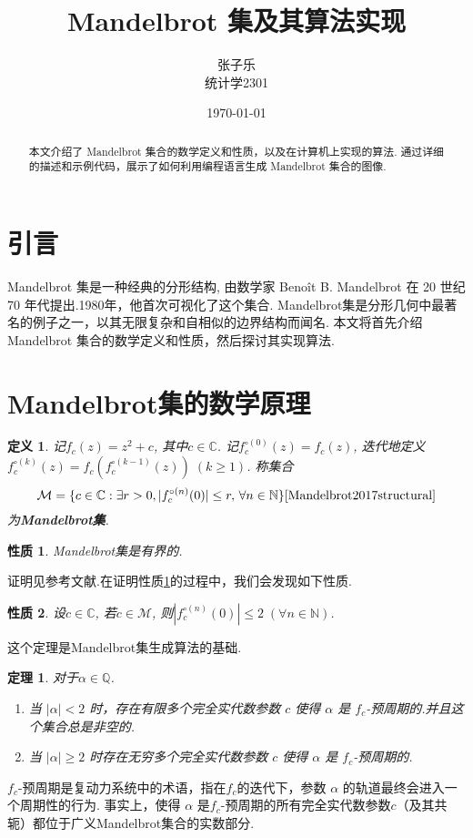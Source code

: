 \documentclass[12pt,a4paper]{ctexart}
\title{Mandelbrot 集及其算法实现}
\author{张子乐 \\ 统计学2301}
\date{\today}
\newtheorem{theorem}{定理}[section]
\newtheorem{definition}{定义}
\newtheorem{property}{性质}
\begin{document}
\maketitle

\begin{abstract}
  本文介绍了 Mandelbrot 集合的数学定义和性质，以及在计算机上实现的算法. 
  通过详细的描述和示例代码，展示了如何利用编程语言生成 Mandelbrot 集合的图像. 
\end{abstract}

\section{引言}
Mandelbrot 集是一种经典的分形结构,  由数学家 Benoît B. Mandelbrot 在 20 世纪 70 年代提出.1980年，他首次可视化了这个集合.
\cite{Mandelbrot2017structural}
Mandelbrot集是分形几何中最著名的例子之一，以其无限复杂和自相似的边界结构而闻名.
本文将首先介绍 Mandelbrot 集合的数学定义和性质，然后探讨其实现算法. 

\section{Mandelbrot集的数学原理}

\begin{definition}
    记$f_c(z)=z^2+c$, 其中$c\in\mathbb{C}$. 记$f_c^{\circ(0)}(z)=f_c(z)$, 
    迭代地定义$f^{\circ(k)}_c(z)=f_c(f^{\circ(k-1)}_c(z))\;(k\geq 1)$. 称集合
    \begin{equation*}
        \mathcal{M}=\{c \in \mathbb{C} : \exists r > 0, | f_c^{\circ(n)}(0) | \leq r, \, \forall n \in \mathbb{N}\}
        \cite{Mandelbrot2017structural}
    \end{equation*}
    为\textbf{Mandelbrot集}.
\end{definition}

\begin{property}
    \label{prop::bounded1}
    Mandelbrot集是有界的.
\end{property}
证明见参考文献\cite{Mandelbrot2017structural}.在证明性质\ref{prop::bounded1}的过程中，我们会发现如下性质.

\begin{property}
    \label{prop::bounded2}
    设$c\in\mathbb{C}$, 若$c\in\mathcal{M}$, 
    则$|f_c^{\circ(n)}(0)|\leq 2\;(\forall n\in\mathbb{N})$.
\end{property}
这个定理是Mandelbrot集生成算法的基础. 

\begin{theorem} \label{theorem:alpha}
    对于$\alpha \in \mathbb{Q}$.
    \begin{enumerate}
    \item 当 $|\alpha| < 2 $ 时，存在有限多个完全实代数参数 $c$ 使得 $\alpha$ 是 $f_c$-预周期的.并且这个集合总是非空的.
    \item 当 $|\alpha| \geq 2$ 时存在无穷多个完全实代数参数 $c$ 使得 $\alpha$ 是 $f_c$-预周期的. 
    \end{enumerate}
\end{theorem}
$f_c$-预周期是复动力系统中的术语，指在$f_c$的迭代下，参数 $\alpha$ 的轨道最终会进入一个周期性的行为.
事实上，使得 $\alpha$ 是$f_c$-预周期的所有完全实代数参数\(c\)（及其共轭）都位于广义Mandelbrot集合的实数部分.\cite{Mandelbrotset2024}
\end{document}

